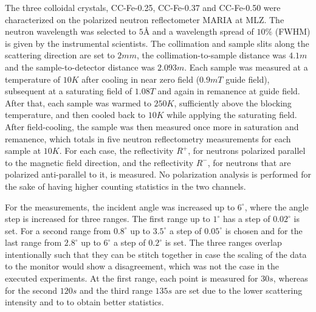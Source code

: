 \documentclass[\main/dresen_thesis.tex]{subfiles}
\begin{document}
    The three colloidal crystals, CC-Fe-0.25, CC-Fe-0.37 and CC-Fe-0.50 were characterized on the polarized neutron reflectometer MARIA at MLZ.
    The neutron wavelength was selected to $5 \unit{\angstrom}$ and a wavelength spread of $10 \unit{\%}$ (FWHM) is given by the instrumental scientists.
    The collimation and sample slits along the scattering direction are set to $2 \unit{mm}$, the collimation-to-sample distance was $4.1 \unit{m}$ and the sample-to-detector distance was $2.093 \unit{m}$.
    Each sample was measured at a temperature of $10 \unit{K}$ after cooling in near zero field ($0.9 \unit{mT}$ guide field), subsequent at a saturating field of $1.08 \unit{T}$ and again in remanence at guide field.
    After that, each sample was warmed to $250 \unit{K}$, sufficiently above the blocking temperature, and then cooled back to $10 \unit{K}$ while applying the saturating field.
    After field-cooling, the sample was then measured once more in saturation and remanence, which totals in five neutron reflectometry measurements for each sample at $10 \unit{K}$.
    For each case, the reflectivity $R^{+}$, for neutrons polarized parallel to the magnetic field direction, and the reflectivity $R^{-}$, for neutrons that are polarized anti-parallel to it, is measured.
    No polarization analysis is performed for the sake of having higher counting statistics in the two channels.

    For the measurements, the incident angle was increased up to $6 ^\circ$, where the angle step is increased for three ranges.
    The first range up to $1 ^\circ$ has a step of $0.02 ^\circ$ is set.
    For a second range from $0.8 ^\circ$ up to $3.5 ^\circ$ a step of $0.05 ^\circ$ is chosen and for the last range from $2.8 ^\circ$ up to $6 ^\circ$ a step of $0.2 ^\circ$ is set.
    The three ranges overlap intentionally such that they can be stitch together in case the scaling of the data to the monitor would show a disagreement, which was not the case in the executed experiments.
    At the first range, each point is measured for $30 \unit{s}$, whereas for the second $120 \unit{s}$ and the third range $135 \unit{s}$ are set due to the lower scattering intensity and to to obtain better statistics.
\end{document}
